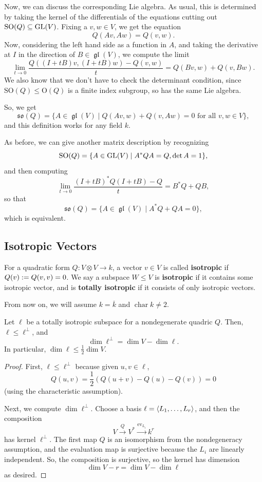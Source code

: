 \documentclass[12pt]{article}
\newcommand{\gl}{\operatorname{\mathfrak{gl}}}
\newcommand{\so}{\mathfrak{so}}
\newcommand{\SO}{\mathrm{SO}}
\begin{document}
Now, we can discuss the corresponding Lie algebra. As usual, this is determined by taking the kernel of the differentials of the equations cutting out $\SO(Q) \subseteq \GL(V)$. Fixing a $v,w\in V$, we get the equation
\[Q(Av,Aw) = Q(v,w).\]
Now, considering the left hand side as a function in $A$, and taking the derivative at $I$ in the direction of $B\in \gl(V)$, we compute the limit
\[\lim_{t\to 0} \frac{Q((I+tB)v,(I+tB)w) - Q(v,w)}{t} = Q(Bv,w) + Q(v,Bw).\]
We also know that we don't have to check the determinant condition, since $\SO(Q) \leq \mathrm{O}(Q)$ is a finite index subgroup, so has the same Lie algebra.

So, we get
\[\so(Q) = \{A\in \gl(V) \mid Q(Av,w)+Q(v,Aw) = 0 \text{ for all } v,w\in V\},\]
and this definition works for any field $k$.

As before, we can give another matrix description by recognizing
\[\SO(Q) = \{A\in \GL(V) \mid A^*QA = Q, \det A = 1\},\]
and then computing
\[\lim_{t\to 0} \frac{(I+tB)^*Q(I+tB) - Q}{t} = B^*Q + QB,\]
so that
\[\so(Q) = \{A\in \gl(V) \mid A^*Q + QA = 0\},\]
which is equivalent.

\subsection{Isotropic Vectors}

\begin{defn}
    For a quadratic form $Q:V\otimes V \to k$, a vector $v\in V$ is called \textbf{isotropic} if $Q(v):= Q(v,v)=0$. We say a subspace $W\leq V$ is \textbf{isotropic} if it contains some isotropic vector, and is \textbf{totally isotropic} if it consists of only isotropic vectors.
\end{defn}

From now on, we will assume $k=\overline{k}$ and $\operatorname{char} k \neq 2$.

\begin{prop}
    Let $\ell$ be a totally isotropic subspace for a nondegenerate quadric $Q$. Then, $\ell\leq \ell^\perp$, and
    \[\dim \ell^\perp = \dim V - \dim \ell.\]
    In particular, $\dim \ell \leq \frac{1}{2} \dim V$.
\end{prop}
\begin{proof}
    First, $\ell \leq \ell^\perp$ because given $u,v\in \ell$,
    \[Q(u,v) = \frac{1}{2}(Q(u+v) - Q(u) - Q(v)) = 0\]
    (using the characteristic assumption).

    Next, we compute $\dim \ell^\perp$. Choose a basis $\ell = \left\langle L_1,\dots,L_r\right\rangle$, and then the composition
    \[V \xrightarrow{Q} V^* \xrightarrow{\mathrm{ev}_{L_i}} k^r\]
    has kernel $\ell^\perp$. The first map $Q$ is an isomorphism from the nondegeneracy assumption, and the evaluation map is surjective because the $L_i$ are linearly independent. So, the composition is surjective, so the kernel has dimension
    \[\dim V - r = \dim V - \dim \ell\]
    as desired.
\end{proof}
\end{document}
